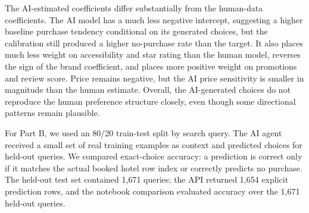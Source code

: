 \documentclass[11pt]{article}
\begin{document}
\begin{table}[H]
\centering
\caption{Problem 7 human vs. AI-generated MNL coefficients.}
\end{table}

The AI-estimated coefficients differ substantially from the human-data coefficients. The AI model has a much less negative intercept, suggesting a higher baseline purchase tendency conditional on its generated choices, but the calibration still produced a higher no-purchase rate than the target. It also places much less weight on accessibility and star rating than the human model, reverses the sign of the brand coefficient, and places more positive weight on promotions and review score. Price remains negative, but the AI price sensitivity is smaller in magnitude than the human estimate. Overall, the AI-generated choices do not reproduce the human preference structure closely, even though some directional patterns remain plausible.

For Part B, we used an 80/20 train-test split by search query. The AI agent received a small set of real training examples as context and predicted choices for held-out queries. We compared exact-choice accuracy: a prediction is correct only if it matches the actual booked hotel row index or correctly predicts no purchase. The held-out test set contained 1,671 queries; the API returned 1,654 explicit prediction rows, and the notebook comparison evaluated accuracy over the 1,671 held-out queries.
\end{document}
